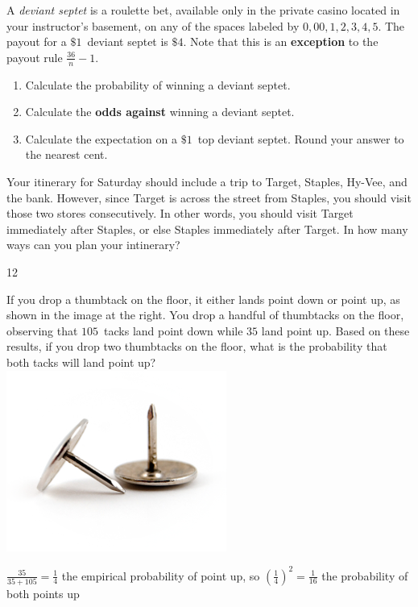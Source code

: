 \documentclass[answers,addpoints,12pt]{exam}
\begin{document}
\begin{questions}
\begin{solution}
\end{solution}

\question[10]
A {\em deviant septet} is a roulette bet,
available only in the private casino located
in your instructor's basement, on any of the spaces labeled by
$0,00,1,2,3,4,5$. The payout for a $\$1$~deviant septet
is $\$4$.
Note that this is an {\bf exception} to the
payout rule $\frac{36}{n}-1$.
\begin{enumerate}
\item Calculate the probability of winning a deviant septet.
\item Calculate the {\bf odds against} winning a deviant septet.
\item Calculate the expectation on a $\$1$~top deviant septet.
Round your answer to the nearest cent.
\end{enumerate}

\question[15] Your itinerary for Saturday should
include a trip to Target, Staples, Hy-Vee, and the bank.
However, since Target is across the street from Staples,
you should visit those two stores consecutively. In other
words, you should visit Target immediately after Staples, or else
Staples immediately after Target. In how many ways
can you plan your intinerary?
\begin{solution}12\end{solution}

\question[10]
\begin{multicols}{2}
If you drop a thumbtack on the floor, it either lands point down
or point up, as shown in the image at the right.
You drop a handful of thumbtacks on the floor, observing that
$105$~tacks land point down while $35$ land point up.
Based on these results, if you drop two thumbtacks on the floor, what
is the probability that both tacks will land point up?
\columnbreak\\
\includegraphics[scale=.6]{Thumbtacks}
\end{multicols}
\begin{solution}
$\frac{35}{35+105}=\frac{1}{4}$ the empirical probability
of point up, so $\left(\frac{1}{4}\right)^2=\frac{1}{16}$
the probability of both points up
\end{solution}


\end{questions}
\end{document}
